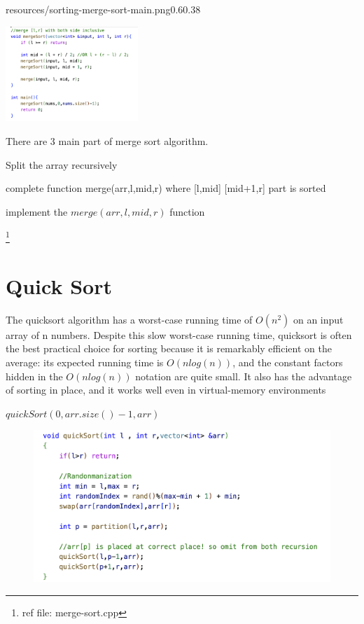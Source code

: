  \vspace{1.7cm} 
 \begin{lfigure}{resources/sorting-merge-sort-main.png}{0.6}{0.38}

     
     \includegraphics[width=5cm]{resources/sorting-merge-sort-base.png}

     There are 3 main part of merge sort algorithm.
     \begin{compactenum}
          \item  Split the array recursively 
          \item complete function merge(arr,l,mid,r) where [l,mid] [mid+1,r] part is sorted
          \item implement the $merge(arr,l,mid,r)$ function 
     \end{compactenum}
     \footnote{ref file: merge-sort.cpp}
 \end{lfigure}


 \section{Quick Sort}
 The quicksort algorithm has a worst-case running time of $O(n^2)$ on an input array
of n numbers. Despite this slow worst-case running time, quicksort is often the best
practical choice for sorting because it is remarkably efficient on the average: its
expected running time is  $O(nlog(n))$, and the constant factors hidden in the $O(nlog(n))$
notation are quite small. It also has the advantage of sorting in place, and it works well even in virtual-memory environments
 
$quickSort(0,arr.size()-1,arr)$
\begin{figure}
     \includegraphics[width=\dimexpr\textwidth]{resources/sorting-quick-sort-1-split.png}
\end{figure}

